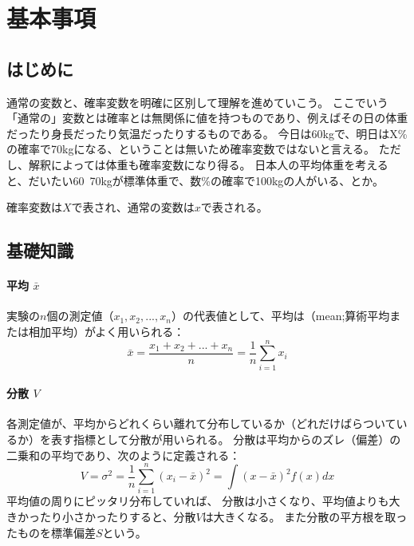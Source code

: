 
\chapter{基本事項}

\section{はじめに}

通常の変数と、確率変数を明確に区別して理解を進めていこう。
ここでいう「通常の」変数とは確率とは無関係に値を持つものであり、例えばその日の体重だったり身長だったり気温だったりするものである。
今日は60kgで、明日はX\%の確率で70kgになる、ということは無いため確率変数ではないと言える。
ただし、解釈によっては体重も確率変数になり得る。
日本人の平均体重を考えると、だいたい60~70kgが標準体重で、数\%の確率で100kgの人がいる、とか。

確率変数は$X$で表され、通常の変数は$x$で表される。

\section{基礎知識}

\subsubsection{平均 $\bar{x}$}

実験の$n$個の測定値（$x_1,x_2,...,x_n$）の代表値として、平均は（mean;算術平均または相加平均）がよく用いられる：
\begin{equation}
  \bar{x} = \frac{x_1 + x_2 + ... + x_n}{n}  = \frac{1}{n} \sum_{i=1}^{n} x_i
\end{equation}


\subsubsection{分散 $V$}

各測定値が、平均からどれくらい離れて分布しているか（どれだけばらついているか）を表す指標として分散が用いられる。
分散は平均からのズレ（偏差）の二乗和の平均であり、次のように定義される：
\begin{equation}
  V= \sigma^2 = \frac{1}{n}\sum_{i=1}^{n} (x_{i}-\bar{x})^{2} = \int (x-\bar{x})^2f(x)dx
\end{equation}
平均値の周りにピッタリ分布していれば、 分散は小さくなり、平均値よりも大きかったり小さかったりすると、分散$V$は大きくなる。
また分散の平方根を取ったものを標準偏差$S$という。

